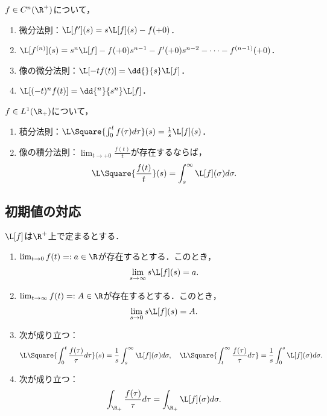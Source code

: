 \documentclass[uplatex,dvipdfmx]{jsreport}
\begin{document}
\begin{proposition}[微分との可換性]
    $f\in C^n(\R^+)$について，
    \begin{enumerate}
        \item 微分法則：$\L[f'](s)=s\L[f](s)-f(+0)$．
        \item $\L[f^{(n)}](s)=s^n\L[f]-f(+0)s^{n-1}-f'(+0)s^{n-2}-\cdots-f^{(n-1)}(+0)$．
        \item 像の微分法則：$\L[-tf(t)]=\dd{}{s}\L[f]$．
        \item $\L[(-t)^nf(t)]=\dd{^n}{s^n}\L[f]$．
    \end{enumerate}
\end{proposition}

\begin{proposition}[積分との可換性]
    $f\in L^1(\R_+)$について，
    \begin{enumerate}
        \item 積分法則：$\L\Square{\int^t_0f(\tau)d\tau}(s)=\frac{1}{s}\L[f](s)$．
        \item 像の積分法則：$\lim_{t\to+0}\frac{f(t)}{t}$が存在するならば，
        \[\L\Square{\frac{f(t)}{t}}(s)=\int^\infty_s\L[f](\sigma)d\sigma.\]
    \end{enumerate}
\end{proposition}

\subsection{初期値の対応}

\begin{theorem}
    $\L[f]$は$\R^+$上で定まるとする．
    \begin{enumerate}
        \item $\lim_{t\to0}f(t)=:a\in\R$が存在するとする．このとき，
        \[\lim_{s\to\infty}s\L[f](s)=a.\]
        \item $\lim_{t\to\infty}f(t)=:A\in\R$が存在するとする．このとき，
        \[\lim_{s\to0}s\L[f](s)=A.\]
        \item 次が成り立つ：
        \[\L\Square{\int^t_0\frac{f(\tau)}{\tau}d\tau}(s)=\frac{1}{s}\int^\infty_s\L[f](\sigma)d\sigma,\quad\L\Square{\int^\infty_t\frac{f(\tau)}{\tau}d\tau}=\frac{1}{s}\int^s_0\L[f](\sigma)d\sigma.\]
        \item 次が成り立つ：
        \[\int_{\R_+}\frac{f(\tau)}{\tau}d\tau=\int_{\R_+}\L[f](\sigma)d\sigma.\]
    \end{enumerate}
\end{theorem}
\end{document}
